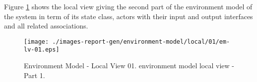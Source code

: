 
Figure \ref{fig:lu.uni.lassy.excalibur.examples.icrash-EM-view-local-01} 
shows the local view giving the second part of the environment model of the system in term of its state class, actors with their input and output interfaces and all related associations.


\begin{figure}[htbp] 
\label{fig:lu.uni.lassy.excalibur.examples.icrash-EM}
\begin{center}
\texttt{[image: ./images-report-gen/environment-model/local/01/em-lv-01.eps]}
\end{center}
\caption[Environment Model - Local View 01 - environment model local view - Part ]{Environment Model - Local View 01. environment model local view - Part 1.}
\label{fig:lu.uni.lassy.excalibur.examples.icrash-EM-view-local-01}
\end{figure}
\vspace{0.5cm} 
